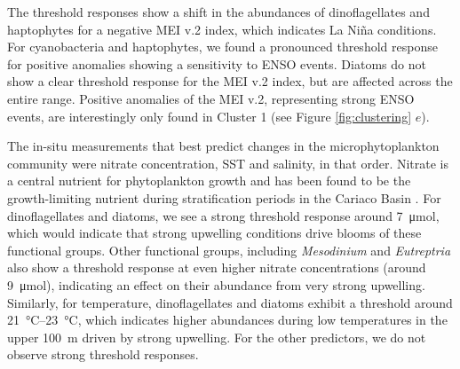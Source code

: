 The threshold responses show a shift in the abundances of dinoflagellates and haptophytes for a negative MEI v.2 index, which indicates La Niña conditions. For cyanobacteria and haptophytes, we found a pronounced threshold response for positive anomalies showing a sensitivity to ENSO events. Diatoms do not show a clear threshold response for the MEI v.2 index, but are affected across the entire range. Positive anomalies of the MEI v.2, representing strong ENSO events, are interestingly only found in Cluster 1 (see Figure \ref{fig:clustering} $e$). 

The in-situ measurements that best predict changes in the microphytoplankton community were nitrate concentration, SST and salinity, in that order. Nitrate is a central nutrient for phytoplankton growth and has been found to be the growth-limiting nutrient during stratification periods in the Cariaco Basin \cite{muller-karger_scientific_2019}. For dinoflagellates and diatoms, we see a strong threshold response around \qty{7}{\micro \mole}, which would indicate that strong upwelling conditions drive blooms of these functional groups. Other functional groups, including \textit{Mesodinium} and \textit{Eutreptria} also show a threshold response at even higher nitrate concentrations (around \qty{9}{\micro \mole}), indicating an effect on their abundance from very strong upwelling. Similarly, for temperature, dinoflagellates and diatoms exhibit a threshold around \qtyrange{21}{23}{\celsius}, which indicates higher abundances during low temperatures in the upper \qty{100}{m} driven by strong upwelling. For the other predictors, we do not observe strong threshold responses.

